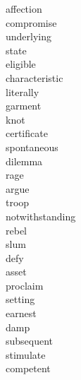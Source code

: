 \documentclass[a4paper, 11pt]{ctexart}
\begin{document}
\begin{multicols*}{3}
\begin{description}
\item[affection]

\item[compromise]

\item[underlying]

\item[state]

\item[eligible]

\item[characteristic]

\item[literally]

\item[garment]

\item[knot]

\item[certificate]

\item[spontaneous]

\item[dilemma]

\item[rage]

\item[argue]

\item[troop]

\item[notwithstanding]

\item[rebel]

\item[slum]

\item[defy]

\item[asset]

\item[proclaim]

\item[setting]

\item[earnest]

\item[damp]

\item[subsequent]

\item[stimulate]

\item[competent]


\end{description}
\end{multicols*}
\end{document}

